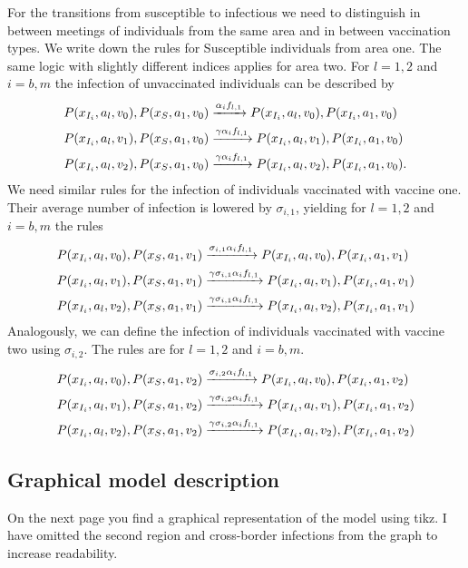 For the transitions from susceptible to infectious we need to distinguish in between meetings of individuals from the same area and in between vaccination types. We write down the rules for Susceptible individuals from area one. The same logic with slightly different indices applies for area two. 
For $l = 1,2$ and $i = b,m$ the infection of unvaccinated individuals can be described by
\begin{align}
    P(x_{I_i}, a_l, v_0), P(x_{S}, a_1, v_0) &\xrightarrow{\alpha_i f_{l,1}} P(x_{I_i}, a_l, v_0), P(x_{I_i}, a_1, v_0) \\
    P(x_{I_i}, a_l, v_1), P(x_{S}, a_1, v_0) &\xrightarrow{\gamma \alpha_i f_{l,1}} P(x_{I_i}, a_l, v_1), P(x_{I_i}, a_1, v_0)\notag\\
    P(x_{I_i}, a_l, v_2), P(x_{S}, a_1, v_0) &\xrightarrow{\gamma \alpha_i f_{l,1}} P(x_{I_i}, a_l, v_2), P(x_{I_i}, a_1, v_0).\notag
\end{align}
We need similar rules for the infection of individuals vaccinated with vaccine one. Their average number of infection is lowered by $\sigma_{i,1}$, yielding for $l = 1,2$ and $i = b,m$ the rules 
\begin{align}
  P(x_{I_i}, a_l, v_0), P(x_{S}, a_1, v_1) &\xrightarrow{\sigma_{i,1} \alpha_i f_{l,1}} P(x_{I_i}, a_l, v_0), P(x_{I_i}, a_1, v_1) \\
    P(x_{I_i}, a_l, v_1), P(x_{S}, a_1, v_1) &\xrightarrow{\gamma \sigma_{i,1} \alpha_i f_{l,1}} P(x_{I_i}, a_l, v_1), P(x_{I_i}, a_1, v_1) \notag\\
    P(x_{I_i}, a_l, v_2), P(x_{S}, a_1, v_1) &\xrightarrow{\gamma \sigma_{i,1} \alpha_i f_{l,1}} P(x_{I_i}, a_l, v_2), P(x_{I_i}, a_1, v_1) \notag
\end{align}
Analogously, we can define the infection of individuals vaccinated with vaccine two using $\sigma_{i,2}$. The rules are for $l = 1,2$ and $i = b,m$. 
\begin{align}
    P(x_{I_i}, a_l, v_0), P(x_{S}, a_1, v_2) &\xrightarrow{\sigma_{i,2} \alpha_i f_{l,1}} P(x_{I_i}, a_l, v_0), P(x_{I_i}, a_1, v_2) \\
    P(x_{I_i}, a_l, v_1), P(x_{S}, a_1, v_2) &\xrightarrow{\gamma \sigma_{i,2} \alpha_i f_{l,1}} P(x_{I_i}, a_l, v_1), P(x_{I_i}, a_1, v_2)\notag\\
    P(x_{I_i}, a_l, v_2), P(x_{S}, a_1, v_2) &\xrightarrow{\gamma \sigma_{i,2} \alpha_i f_{l,1}} P(x_{I_i}, a_l, v_2), P(x_{I_i}, a_1, v_2)\notag
\end{align}

\subsection{Graphical model description}
On the next page you find a graphical representation of the model using tikz. I have omitted the second region and cross-border infections from the graph to increase readability.  

